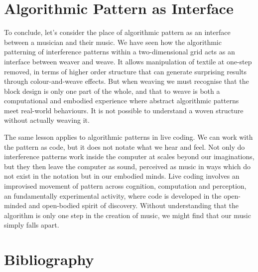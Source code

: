 \documentclass{nime-alternate} %
\begin{document}
\hypertarget{algorithmic-pattern-as-interface}{%
\section{Algorithmic Pattern as
Interface}\label{algorithmic-pattern-as-interface}}

To conclude, let's consider the place of algorithmic pattern as an
interface between a musician and their music. We have seen how the
algorithmic patterning of interference patterns within a two-dimensional
grid acts as an interface between weaver and weave. It allows
manipulation of textile at one-step removed, in terms of higher order
structure that can generate surprising results through colour-and-weave
effects. But when weaving we must recognise that the block design is
only one part of the whole, and that to weave is both a computational
and embodied experience where abstract algorithmic patterns meet
real-world behaviours. It is not possible to understand a woven
structure without actually weaving it.

The same lesson applies to algorithmic patterns in live coding. We can
work with the pattern as code, but it does not notate what we hear and
feel. Not only do interference patterns work inside the computer at
scales beyond our imaginations, but they then leave the computer as
sound, perceived as music in ways which do not exist in the notation but
in our embodied minds. Live coding involves an improvised movement of
pattern across cognition, computation and perception, an fundamentally
experimental activity, where code is developed in the open-minded and
open-bodied spirit of discovery. Without understanding that the
algorithm is only one step in the creation of music, we might find that
our music simply falls apart.

\hypertarget{bibliography}{%
\section{Bibliography}\label{bibliography}}

\small
\end{document}
